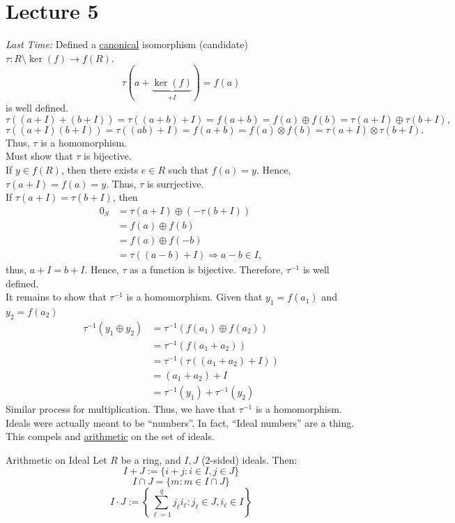 \documentclass[twoside, openright, fontsize=10pt, headings=big]{scrbook}
\begin{document}
\chapter{Lecture 5}
\textit{Last Time:} Defined a \underline{canonical} isomorphism (candidate) $\tau:R\setminus\ker(f)\to f(R)$.
\[
    \tau(a+\underbrace{\ker(f)}_{+I})=f(a)
\]
is well defined.\\
\[
    \tau((a+I)+(b+I))=\tau((a+b)+I)=f(a+b)=f(a)\oplus f(b)=\tau(a+I)\oplus\tau(b+I),
\]
\[
    \tau((a+I)(b+I))=\tau((ab)+I)=f(a+b)=f(a)\otimes f(b)=\tau(a+I)\otimes\tau(b+I).
\]
Thus, $\tau$ is a homomorphism.\\
Must show that $\tau$ is bijective.\\
If $y\in f(R)$, then there exists $e\in R$ such that $f(a)=y$. Hence, $\tau(a+I)=f(a)=y$. Thus, $\tau$ is surrjective.\\
If $\tau(a+I)=\tau(b+I)$, then 
\begin{align*}
    0_S&=\tau(a+I)\oplus(-\tau(b+I))\\
    &=f(a)\oplus f(b)\\
    &=f(a)\oplus f(-b)\\
    &=\tau((a-b)+I)\Rightarrow a-b\in I,
\end{align*}
thus, $a+I=b+I$. Hence, $\tau$ as a function is bijective. Therefore, $\tau^{-1}$ is well defined.\\
It remains to show that $\tau^{-1}$ is a homomorphism. Given that $y_1=f(a_1)$ and $y_2=f(a_2)$
\begin{align*}
    \tau^{-1}(y_1\oplus y_2)&=\tau^{-1}(f(a_1)\oplus f(a_2))\\
    &=\tau^{-1}(f(a_1+a_2))\\
    &=\tau^{-1}(\tau((a_1+a_2)+I))\\
    &=(a_1+a_2)+I\\
    &=\tau^{-1}(y_1)+\tau^{-1}(y_2)
\end{align*}
Similar process for multiplication. Thus, we have that $\tau^{-1}$ is a homomorphism.\\
Ideals were actually meant to be ``numbers''. In fact, ``Ideal numbers'' are a thing. This compels and \underline{arithmetic} on the set of ideals.
\begin{definition}{Arithmetic on Ideal}{}
    Let $R$ be a ring, and $I,J$ (2-sided) ideals. Then:
    \[
        I+J:=\{i+j:i\in I,j\in J\}
    \]
    \[
        I\cap J=\{m:m\in I\cap J\}
    \]
    \[
        I\cdot J:=\left\{\sum_{\ell=1}^{q}j_\ell i_\ell:j_\ell\in J, i_\ell\in I \right\}
    \]
\end{definition}
\end{document}
